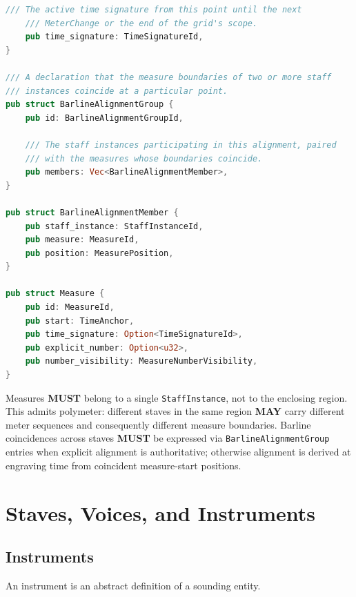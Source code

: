 \documentclass[11pt,letterpaper]{report}
\newcounter{requirement}[chapter]
\newcommand{\MUST}{\textbf{MUST}}
\newcommand{\MAY}{\textbf{MAY}}
\begin{document}
\begin{lstlisting}[language=Rust]
    /// The active time signature from this point until the next
    /// MeterChange or the end of the grid's scope.
    pub time_signature: TimeSignatureId,
}

/// A declaration that the measure boundaries of two or more staff
/// instances coincide at a particular point.
pub struct BarlineAlignmentGroup {
    pub id: BarlineAlignmentGroupId,

    /// The staff instances participating in this alignment, paired
    /// with the measures whose boundaries coincide.
    pub members: Vec<BarlineAlignmentMember>,
}

pub struct BarlineAlignmentMember {
    pub staff_instance: StaffInstanceId,
    pub measure: MeasureId,
    pub position: MeasurePosition,
}

pub struct Measure {
    pub id: MeasureId,
    pub start: TimeAnchor,
    pub time_signature: Option<TimeSignatureId>,
    pub explicit_number: Option<u32>,
    pub number_visibility: MeasureNumberVisibility,
}
\end{lstlisting}

\begin{requirement}
  \label{req:graph:staff-owned-measures}
  Measures \MUST{} belong to a single \texttt{StaffInstance}, not to
  the enclosing region. This admits polymeter: different staves in
  the same region \MAY{} carry different meter sequences and
  consequently different measure boundaries. Barline coincidences
  across staves \MUST{} be expressed via
  \texttt{BarlineAlignmentGroup} entries when explicit alignment is
  authoritative; otherwise alignment is derived at engraving time
  from coincident measure-start positions.
\end{requirement}

\section{Staves, Voices, and Instruments}
\label{sec:graph:staves}

\subsection{Instruments}

An instrument is an abstract definition of a sounding entity.
\end{document}

